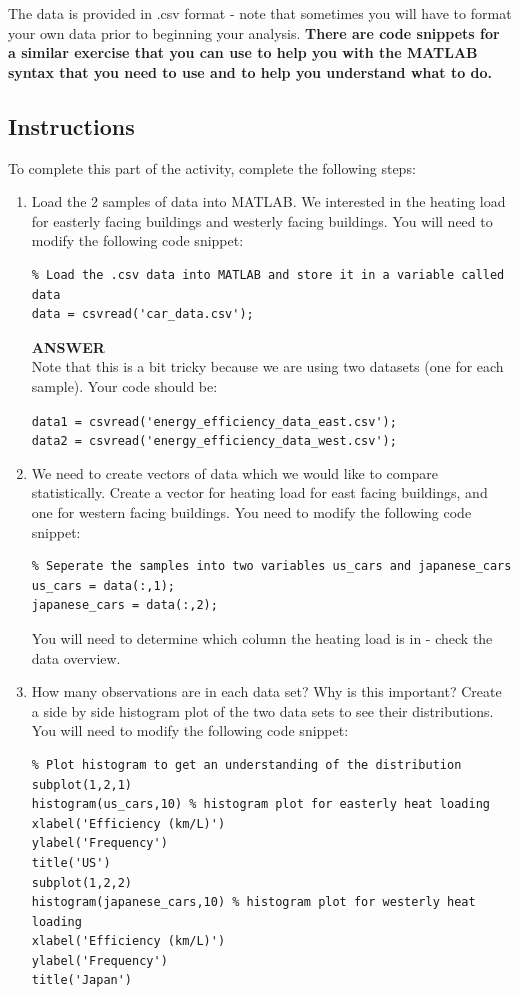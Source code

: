 \documentclass[12pt]{article}
\begin{document}
The data is provided in .csv format - note that sometimes you will have to format your own data prior to beginning your analysis. \textbf{There are code snippets for a similar exercise that you can use to help you with the MATLAB syntax that you need to use and to help you understand what to do.}

\subsection*{Instructions}
To complete this part of the activity, complete the following steps:
\begin{enumerate}
\item Load the 2 samples of data into MATLAB. We interested in the heating load for easterly facing buildings and westerly facing buildings. You will need to modify the following code snippet:
\vspace{-0.4cm}
\begin{lstlisting}
% Load the .csv data into MATLAB and store it in a variable called data
data = csvread('car_data.csv');
\end{lstlisting}

\begin{tcolorbox}
\textbf{ANSWER}\\

Note that this is a bit tricky because we are using two datasets (one for each sample). Your code should be:

\verb|data1 = csvread('energy_efficiency_data_east.csv');|\\
\verb|data2 = csvread('energy_efficiency_data_west.csv');|
\end{tcolorbox}

\item We need to create vectors of data which we would like to compare statistically. Create a vector for heating load for east facing buildings, and one for western facing buildings. You need to modify the following code snippet:
\vspace{-0.4cm}
\begin{lstlisting}
% Seperate the samples into two variables us_cars and japanese_cars
us_cars = data(:,1);
japanese_cars = data(:,2);
\end{lstlisting}

You will need to determine which column the heating load is in - check the data overview.

\item How many observations are in each data set? Why is this important? Create a side by side histogram plot of the two data sets to see their distributions. You will need to modify the following code snippet:
\newpage
\begin{lstlisting}
% Plot histogram to get an understanding of the distribution
subplot(1,2,1)
histogram(us_cars,10) % histogram plot for easterly heat loading
xlabel('Efficiency (km/L)')
ylabel('Frequency')
title('US')
subplot(1,2,2)
histogram(japanese_cars,10) % histogram plot for westerly heat loading
xlabel('Efficiency (km/L)')
ylabel('Frequency')
title('Japan')
\end{lstlisting}


\end{enumerate}
\end{document}
